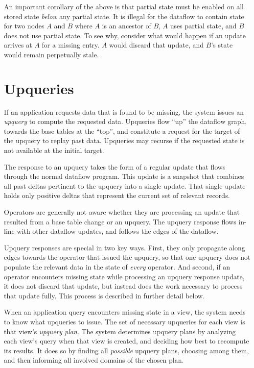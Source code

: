 An important corollary of the above is that partial state must be enabled
on all stored state \emph{below} any partial state. It is illegal for the
dataflow to contain state for two nodes $A$ and $B$ where $A$ is an ancestor of
$B$, $A$ uses partial state, and $B$ does not use partial state. To see why,
consider what would happen if an update arrives at $A$ for a missing entry. $A$
would discard that update, and $B$'s state would remain perpetually stale.

\section{Upqueries}
\label{s:upqueries}

If an application requests data that is found to be missing, the system issues
an \textit{upquery} to compute the requested data. Upqueries flow ``up'' the
dataflow graph, towards the base tables at the ``top'', and constitute a request
for the target of the upquery to replay past data. Upqueries may recurse if the
requested state is not available at the initial target.

The response to an upquery takes the form of a regular update that flows through
the normal dataflow program. This update is a snapshot that combines all past
deltas pertinent to the upquery into a single update. That single update holds
only positive deltas that represent the current set of relevant records.

Operators are generally not aware whether they are processing an update that
resulted from a base table change or an upquery. The upquery response flows
in-line with other dataflow updates, and follows the edges of the dataflow.

Upquery responses are special in two key ways. First, they only propagate along
edges towards the operator that issued the upquery, so that one upquery does not
populate the relevant data in the state of \emph{every} operator. And second,
if an operator encounters missing state while processing an upquery response
update, it does not discard that update, but instead does the work necessary to
process that update fully. This process is described in further detail below.

When an application query encounters missing state in a view, the system needs
to know what upqueries to issue. The set of necessary upqueries for each view is
that view's \textit{upquery plan}. The system determines upquery plans by
analyzing each view's query when that view is created, and deciding how best
to recompute its results. It does so by finding all \emph{possible} upquery
plans, choosing among them, and then informing all involved domains of the
chosen plan.

